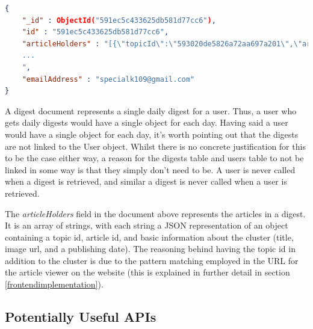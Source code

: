 \documentclass[12pt]{article}
\begin{document}
\begin{lstlisting}[language=json, firstnumber=1, caption={A sample document in the Digests table}]
{
    "_id" : ObjectId("591ec5c433625db581d77cc6"),
    "id" : "591ec5c433625db581d77cc6",
    "articleHolders" : "[{\"topicId\":\"593020de5826a72aa697a201\",\"articleId\":\"59322bc5acea820dd0c7ef37\",\"title\":\"Elon Musk 'intrigued' by India's objective of all-electric cars by 2030 - Times of India\",\"imageUrl\":\"http://timesofindia.indiatimes.com/photo/msid-58964385/58964385.jpg?53722\",\"lastPublished\":\"2017-06-03T08:40:00Z\"},{\"topicId\":\"5930210d5826a72aa697a227\",\"articleId\":\"59324084acea820dd0c7f65b\",\"title\":\"Kathy Griffin loses ALL of her tour gigs in wake of Trump scandal\",\"imageUrl\":\"http://i.dailymail.co.uk/i/pix/2017/06/03/05/410C672100000578-0-image-a-41_1496464334669.jpg\",\"lastPublished\":\"2017-06-03T04:39:14Z\"},{\"topicId\":\"593020de5826a72aa697a201\",\"articleId\":\"59323dddacea820dd0c7f566\",\"title\":\"Putin says hacking of Democratic Party may have been CIA false flag op\",\"imageUrl\":\"http://i.dailymail.co.uk/i/pix/2017/06/03/05/410C6AD500000578-0-image-a-92_1496463783859.jpg\",\"lastPublished\":\"2017-06-03T04:28:04Z\"}
    ...
    ",
    "emailAddress" : "specialk109@gmail.com"
}
\end{lstlisting}

A digest document represents a single daily digest for a user. Thus, a user who gets daily digests would have a single object for each day. Having said a user would have a single object for each day, it's worth pointing out that the digests are not linked to the User object. Whilst there is no concrete justification for this to be the case either way, a reason for the digests table and users table to not be linked in some way is that they simply don't need to be. A user is never called when a digest is retrieved, and similar a digest is never called when a user is retrieved.

The \emph{articleHolders} field in the document above represents the articles in a digest. It is an array of strings, with each string a JSON representation of an object containing a topic id, article id, and basic information about the cluster (title, image url, and a publishing date). The reasoning behind having the topic id in addition to the cluster is due to the pattern matching employed in the URL for the article viewer on the website (this is explained in further detail in section \ref{frontendimplementation}).

\subsection{Potentially Useful APIs}
\end{document}

